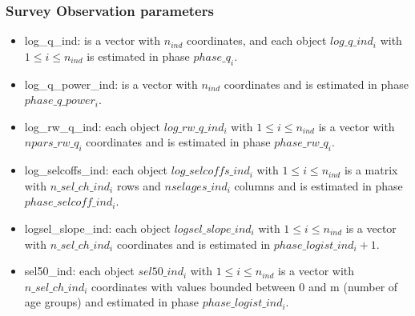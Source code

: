 \documentclass{article}
\begin{document}
\subsubsection{Survey Observation parameters}
\begin{itemize}
    \item log\_q\_ind: is a vector with $n_{ind}$ coordinates, and each object $log\_q\_ind_i$ with $1\leq i \leq n_{ind}$ is estimated in phase $phase\_q_i$. 

    \item log\_q\_power\_ind: is a vector with $n_{ind}$ coordinates and is estimated in phase $phase\_q\_power_i$.

    
    \item log\_rw\_q\_ind: each object $log\_rw\_q\_ind_i$ with $1\leq i \leq n_{ind}$ is a vector with $npars\_rw\_q_i$ coordinates and is estimated in phase $phase\_rw\_q_i$.

    
    
    \item log\_selcoffs\_ind: each object $log\_selcoffs\_ind_i$ with $1\leq i \leq n_{ind}$ is a matrix with $n\_sel\_ch\_ind_i$ rows and $nselages\_ind_i$ columns and is estimated in phase $phase\_selcoff\_ind_i$.
    
    
    \item logsel\_slope\_ind: each object $logsel\_slope\_ind_i$ with $1\leq i \leq n_{ind}$ is a vector with $n\_sel\_ch\_ind_i$ coordinates and is estimated in $phase\_logist\_ind_i+1$.
    
    
    \item sel50\_ind: each object $sel50\_ind_i$ with $1\leq i \leq n_{ind}$ is a  vector with $n\_sel\_ch\_ind_i$ coordinates with values bounded between 0 and m (number of age groups) and estimated in phase $phase\_logist\_ind_i$. 
    

\end{itemize}
\end{document}
